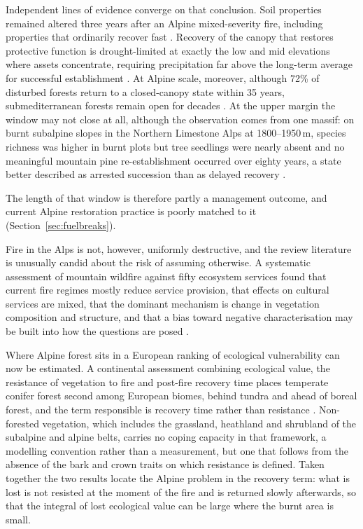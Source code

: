 \documentclass[11pt,a4paper]{article}
\begin{document}
Independent lines of evidence converge on that conclusion. Soil properties remained altered three years after an Alpine mixed-severity fire, including properties that ordinarily recover fast \citep{negri_wildfire_2026}. Recovery of the canopy that restores protective function is drought-limited at exactly the low and mid elevations where assets concentrate, requiring precipitation far above the long-term average for successful establishment \citep{moser_potential_2010}. At Alpine scale, moreover, although 72\% of disturbed forests return to a closed-canopy state within 35 years, submediterranean forests remain open for decades \citep{stritih_alternative_2023}. At the upper margin the window may not close at all, although the observation comes from one massif: on burnt subalpine slopes in the Northern Limestone Alps at 1800--1950\,m, species richness was higher in burnt plots but tree seedlings were nearly absent and no meaningful mountain pine re-establishment occurred over eighty years, a state better described as arrested succession than as delayed recovery \citep{degiuli_arrested_2024}.

The length of that window is therefore partly a management outcome, and current Alpine restoration practice is poorly matched to it (Section~\ref{sec:fuelbreaks}).

Fire in the Alps is not, however, uniformly destructive, and the review literature is unusually candid about the risk of assuming otherwise. A systematic assessment of mountain wildfire against fifty ecosystem services found that current fire regimes mostly reduce service provision, that effects on cultural services are mixed, that the dominant mechanism is change in vegetation composition and structure, and that a bias toward negative characterisation may be built into how the questions are posed \citep{vukomanovic_systematic_2019}.

Where Alpine forest sits in a European ranking of ecological vulnerability can now be estimated. A continental assessment combining ecological value, the resistance of vegetation to fire and post-fire recovery time places temperate conifer forest second among European biomes, behind tundra and ahead of boreal forest, and the term responsible is recovery time rather than resistance \citep{arrogantefunes_mapping_2024}. Non-forested vegetation, which includes the grassland, heathland and shrubland of the subalpine and alpine belts, carries no coping capacity in that framework, a modelling convention rather than a measurement, but one that follows from the absence of the bark and crown traits on which resistance is defined. Taken together the two results locate the Alpine problem in the recovery term: what is lost is not resisted at the moment of the fire and is returned slowly afterwards, so that the integral of lost ecological value can be large where the burnt area is small.
\end{document}
